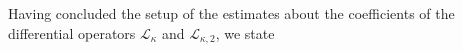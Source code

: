 \documentclass[
	fontsize=11pt, 
	twoside=false, 
	abstract=true, 
	a4paper,
]{scrartcl}
\newcommand{\sem}{\setminus\{0\}}
\newcommand{\RR}{\mathbb{R}}
\newcommand{\abs}[1]{\left\lvert#1\right\rvert}
\newcommand{\del}{\partial}
\begin{document}
Having concluded the setup of the estimates about the coefficients of the differential operators $\mathcal{L}_\kappa$ and $\mathcal{L}_{\kappa,2}$, we state
\end{document}
